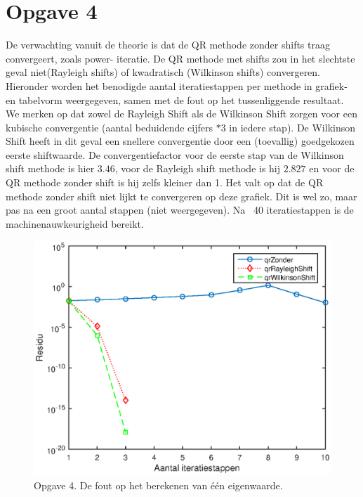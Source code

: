 \documentclass[]{article}
\newcommand{\opgave}[1]{\pagebreak\section*{Opgave #1}}
\begin{document}
\opgave{4}

De verwachting vanuit de theorie is dat de QR methode zonder shifts traag convergeert, zoals power- iteratie. De QR methode met shifts zou in het slechtste geval niet(Rayleigh shifts) of kwadratisch (Wilkinson shifts) convergeren. Hieronder worden het benodigde aantal iteratiestappen per methode in grafiek- en tabelvorm weergegeven, samen met de fout op het tussenliggende resultaat. We merken op dat  zowel de Rayleigh Shift als de Wilkinson Shift zorgen voor een kubische convergentie (aantal beduidende cijfers $* 3$ in iedere stap). 
De Wilkinson Shift heeft in dit geval een snellere convergentie door een (toevallig) goedgekozen eerste shiftwaarde. De convergentiefactor voor de eerste stap van de Wilkinson shift methode is hier $3.46$, voor de Rayleigh shift methode is hij $2.827$ en voor de QR methode zonder shift is hij zelfs kleiner dan 1. Het valt op dat de QR methode zonder shift niet lijkt te convergeren op deze grafiek. Dit is wel zo, maar pas na een groot aantal stappen (niet weergegeven). Na ~40 iteratiestappen is de machinenauwkeurigheid bereikt. 

\begin{figure}
\begin{center}
\includegraphics[width=1\textwidth]{opgave4.eps}
\end{center}
\caption{Opgave 4. De fout op het berekenen van \'e\'en eigenwaarde.}
\label{figuurtje}
\end{figure}
\end{document}
